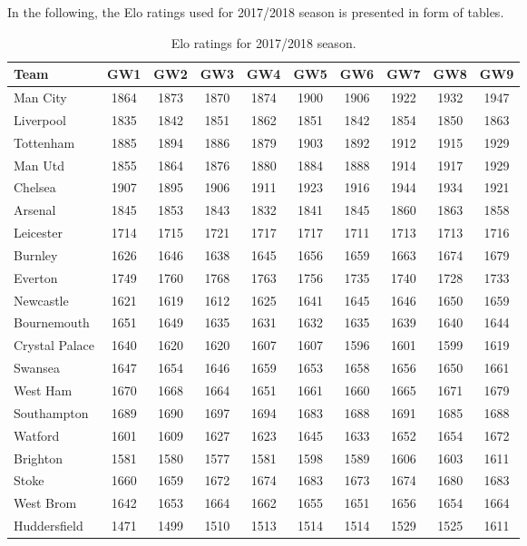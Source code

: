In the following, the Elo ratings used for 2017/2018 season is presented in form of tables.

\begin{table}[H]
\centering
\smaller
\begin{tabular}{|l|c|c|c|c|c|c|c|c|c|}
\hline
Team           & GW1  & GW2  & GW3  & GW4  & GW5  & GW6  & GW7  & GW8  & GW9   \\
\hline
Man City \Tstrut      & 1864 & 1873 & 1870 & 1874 & 1900 & 1906 & 1922 & 1932 & 1947  \\
Liverpool      & 1835 & 1842 & 1851 & 1862 & 1851 & 1842 & 1854 & 1850 & 1863  \\
Tottenham      & 1885 & 1894 & 1886 & 1879 & 1903 & 1892 & 1912 & 1915 & 1929  \\
Man Utd        & 1855 & 1864 & 1876 & 1880 & 1884 & 1888 & 1914 & 1917 & 1929  \\
Chelsea        & 1907 & 1895 & 1906 & 1911 & 1923 & 1916 & 1944 & 1934 & 1921  \\
Arsenal        & 1845 & 1853 & 1843 & 1832 & 1841 & 1845 & 1860 & 1863 & 1858  \\
Leicester      & 1714 & 1715 & 1721 & 1717 & 1717 & 1711 & 1713 & 1713 & 1716  \\
Burnley        & 1626 & 1646 & 1638 & 1645 & 1656 & 1659 & 1663 & 1674 & 1679  \\
Everton        & 1749 & 1760 & 1768 & 1763 & 1756 & 1735 & 1740 & 1728 & 1733  \\
Newcastle      & 1621 & 1619 & 1612 & 1625 & 1641 & 1645 & 1646 & 1650 & 1659  \\
Bournemouth    & 1651 & 1649 & 1635 & 1631 & 1632 & 1635 & 1639 & 1640 & 1644  \\
Crystal Palace & 1640 & 1620 & 1620 & 1607 & 1607 & 1596 & 1601 & 1599 & 1619  \\
Swansea        & 1647 & 1654 & 1646 & 1659 & 1653 & 1658 & 1656 & 1650 & 1661  \\
West Ham       & 1670 & 1668 & 1664 & 1651 & 1661 & 1660 & 1665 & 1671 & 1679  \\
Southampton    & 1689 & 1690 & 1697 & 1694 & 1683 & 1688 & 1691 & 1685 & 1688  \\
Watford        & 1601 & 1609 & 1627 & 1623 & 1645 & 1633 & 1652 & 1654 & 1672  \\
Brighton       & 1581 & 1580 & 1577 & 1581 & 1598 & 1589 & 1606 & 1603 & 1611  \\
Stoke          & 1660 & 1659 & 1672 & 1674 & 1683 & 1673 & 1674 & 1680 & 1683  \\
West Brom      & 1642 & 1653 & 1664 & 1662 & 1655 & 1651 & 1656 & 1654 & 1664  \\
Huddersfield \Bstrut  & 1471 & 1499 & 1510 & 1513 & 1514 & 1514 & 1529 & 1525 & 1611  \\
\hline
\end{tabular}
\caption{Elo ratings for 2017/2018 season.}
\label{tab:elo_values_gameweeks_1}
\end{table}


